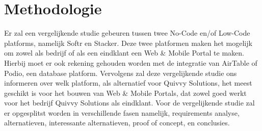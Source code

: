 






\section{Methodologie}%
\label{sec:methodologie}
Er zal een vergelijkende studie gebeuren tussen twee No-Code en/of Low-Code platforms, namelijk Softr en Stacker.
Deze twee platformen maken het mogelijk om zowel als bedrijf of als een eindklant een Web \& Mobile Portal te maken.
Hierbij moet er ook rekening gehouden worden met de integratie van AirTable of Podio, een database platform. 
Vervolgens zal deze vergelijkende studie ons informeren over welk platform, als alternatief voor Quivvy Solutions, het meest geschikt is voor het bouwen van Web \& Mobile Portals,
dat zowel goed werkt voor het bedrijf Quivvy Solutions als eindklant. Voor de vergelijkende studie zal er opgesplitst worden in verschillende fasen namelijk,
requirements analyse, alternatieven, interessante alternatieven, proof of concept, en conclusies.
